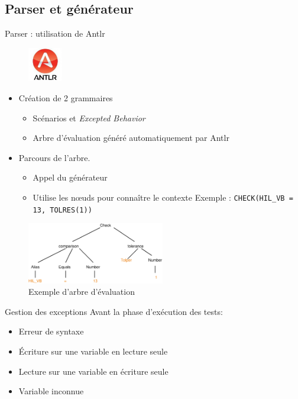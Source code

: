 \documentclass{beamer}
\begin{document}
\subsection{Parser et g\'en\'erateur}
\begin{frame}{Parser : utilisation de Antlr}
~\vspace{-30px}
\begin{figure}
	\includegraphics[width=1.5cm]{antlr.jpg}
\end{figure}
	\vspace{-20px}
	\begin{itemize}
		\item Création de 2 grammaires 
			\begin{itemize}
				\item Scénarios et \textit{Excepted Behavior}
				\item Arbre d'évaluation généré automatiquement par Antlr
			\end{itemize}
		\item Parcours de l'arbre. 
			\begin{itemize}
				\item Appel du générateur
				\item Utilise les n\oe{}uds pour connaître le contexte\newline 
				\scriptsize Exemple : \texttt{CHECK(HIL\_VB = 13, TOLRES(1))}
			\end{itemize}
	\end{itemize}
	\begin{figure}[h]
		\centering
		\includegraphics[width=6cm]{treeCheck.eps}
		\caption{Exemple d'arbre d'évaluation}
	\end{figure}
	\end{frame}
	\begin{frame}{Gestion des exceptions}
	\footnotesize
	Avant la phase d'exécution des tests: 
	\normalsize
			\begin{itemize}
					\vspace{-10px}
		\item Erreur de syntaxe
		\item Écriture sur une variable en lecture seule
		\item Lecture sur une variable en écriture seule
		\item Variable inconnue 
		\end{itemize}
\end{frame}
\end{document}
